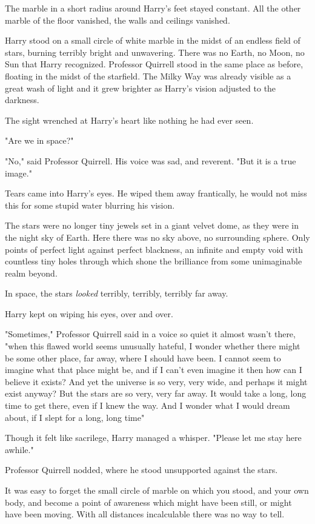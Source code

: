 The marble in a short radius around Harry's feet stayed constant. All the other
marble of the floor vanished, the walls and ceilings vanished.

Harry stood on a small circle of white marble in the midst of an endless field
of stars, burning terribly bright and unwavering. There was no Earth, no Moon,
no Sun that Harry recognized. Professor Quirrell stood in the same place as
before, floating in the midst of the starfield. The Milky Way was already
visible as a great wash of light and it grew brighter as Harry's vision
adjusted to the darkness.

The sight wrenched at Harry's heart like nothing he had ever seen.

"Are we{\el} in space{\el}?"

"No," said Professor Quirrell. His voice was sad, and reverent. "But it is a
true image."

Tears came into Harry's eyes. He wiped them away frantically, he would not miss
this for some stupid water blurring his vision.

The stars were no longer tiny jewels set in a giant velvet dome, as they were
in the night sky of Earth. Here there was no sky above, no surrounding sphere.
Only points of perfect light against perfect blackness, an infinite and empty
void with countless tiny holes through which shone the brilliance from some
unimaginable realm beyond.

In space, the stars \emph{looked} terribly, terribly, terribly far away.

Harry kept on wiping his eyes, over and over.

"Sometimes," Professor Quirrell said in a voice so quiet it almost wasn't
there, "when this flawed world seems unusually hateful, I wonder whether there
might be some other place, far away, where I should have been. I cannot seem to
imagine what that place might be, and if I can't even imagine it then how can I
believe it exists? And yet the universe is so very, very wide, and perhaps it
might exist anyway? But the stars are so very, very far away. It would take a
long, long time to get there, even if I knew the way. And I wonder what I would
dream about, if I slept for a long, long time{\el}"

Though it felt like sacrilege, Harry managed a whisper. "Please let me stay
here awhile."

Professor Quirrell nodded, where he stood unsupported against the stars.

It was easy to forget the small circle of marble on which you stood, and your
own body, and become a point of awareness which might have been still, or might
have been moving. With all distances incalculable there was no way to tell.

